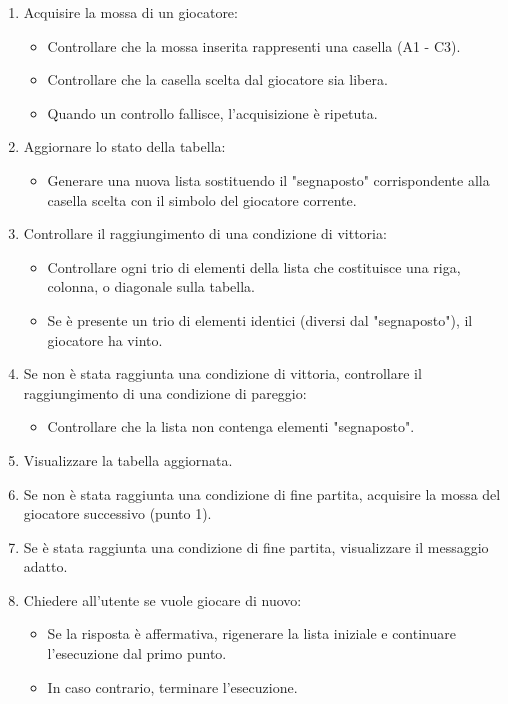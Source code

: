 \documentclass{article}
\begin{document}
\begin{enumerate}
    \item Acquisire la mossa di un giocatore:
    \begin{itemize}
        \item Controllare che la mossa inserita rappresenti una casella (A1 - C3).
        \item Controllare che la casella scelta dal giocatore sia libera.
        \item Quando un controllo fallisce, l'acquisizione è ripetuta.
    \end{itemize}
    \item Aggiornare lo stato della tabella:
    \begin{itemize}
        \item Generare una nuova lista sostituendo il "segnaposto" corrispondente alla casella scelta con il simbolo del giocatore corrente.
    \end{itemize}
    \item Controllare il raggiungimento di una condizione di vittoria:
     \begin{itemize}
        \item Controllare ogni trio di elementi della lista che costituisce una riga, colonna, o diagonale sulla tabella.
        \item Se è presente un trio di elementi identici (diversi dal "segnaposto"), il giocatore ha vinto.
    \end{itemize}
    \item Se non è stata raggiunta una condizione di vittoria, controllare il raggiungimento di una condizione di pareggio:
    \begin{itemize}
        \item Controllare che la lista non contenga elementi "segnaposto".
    \end{itemize}
    \item Visualizzare la tabella aggiornata.
    \item Se non è stata raggiunta una condizione di fine partita, acquisire la mossa del giocatore successivo (punto 1).
    \item Se è stata raggiunta una condizione di fine partita, visualizzare il messaggio adatto.
    \item Chiedere all'utente se vuole giocare di nuovo:
    \begin{itemize}
        \item Se la risposta è affermativa, rigenerare la lista iniziale e continuare l'esecuzione dal primo punto.
        \item In caso contrario, terminare l'esecuzione.
    \end{itemize}
\end{enumerate}
\newpage
\end{document}
